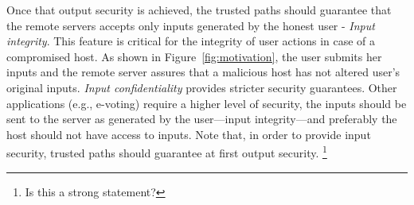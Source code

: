 Once that output security is achieved, the trusted paths should guarantee that the remote servers accepts only inputs generated by the honest user - \emph{Input integrity}. This feature is critical for the integrity of user actions in case of a compromised host. As shown in Figure~\ref{fig:motivation}, the user submits her inputs and the remote server assures that a malicious host has not altered user's original inputs. \emph{Input confidentiality} provides stricter security guarantees. Other applications (e.g., e-voting) require a higher level of security, the inputs should be sent to the server as generated by the user---input integrity---and preferably the host should not have access to inputs. Note that, in order to provide input security, trusted paths should guarantee at first output security. \footnote{Is this a strong statement?}




